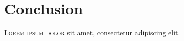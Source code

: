 \chapter{Conclusion}
\lettrine[lines=4, loversize=-0.1, lraise=0.1]{L}{orem ipsum dolor} sit amet, consectetur adipiscing elit.